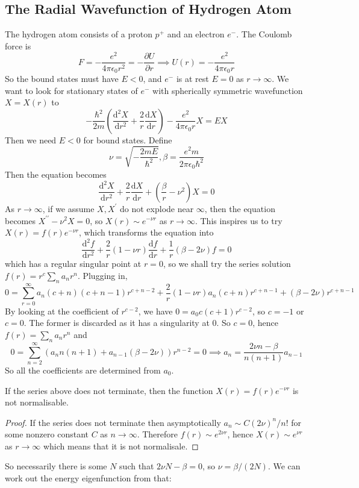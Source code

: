 \subsection{The Radial Wavefunction of Hydrogen Atom}
The hydrogen atom consists of a proton $p^+$ and an electron $e^-$.
The Coulomb force is
$$F=-\frac{e^2}{4\pi\epsilon_0r^2}=-\frac{\partial U}{\partial r}\implies U(r)=-\frac{e^2}{4\pi\epsilon_0r}$$
So the bound states must have $E<0$, and $e^-$ is at rest $E=0$ as $r\to\infty$.
We want to look for stationary states of $e^-$ with spherically symmetric wavefunction $X=X(r)$ to
$$-\frac{\hbar^2}{2m}\left( \frac{\mathrm d^2X}{\mathrm dr^2}+\frac{2}{r}\frac{\mathrm dX}{\mathrm dr} \right)-\frac{e^2}{4\pi\epsilon_0r}X=EX$$
Then we need $E<0$ for bound states.
Define
$$\nu=\sqrt{-\frac{2mE}{\hbar^2}},\beta=\frac{e^2m}{2\pi\epsilon_0\hbar^2}$$
Then the equation becomes
$$\frac{\mathrm d^2X}{\mathrm dr^2}+\frac{2}{r}\frac{\mathrm dX}{\mathrm dr}+\left( \frac{\beta}{r}-\nu^2 \right)X=0$$
As $r\to\infty$, if we assume $X,X^\prime$ do not explode near $\infty$, then the equation becomes $X^{\prime\prime}-\nu^2X=0$, so $X(r)\sim e^{-\nu r}$ as $r\to\infty$.
This inspires us to try $X(r)=f(r)e^{-\nu r}$, which transforms the equation into
$$\frac{\mathrm d^2f}{\mathrm dr^2}+\frac{2}{r}(1-\nu r)\frac{\mathrm df}{\mathrm dr}+\frac{1}{r}(\beta-2\nu)f=0$$
which has a regular singular point at $r=0$, so we shall try the series solution $f(r)=r^c\sum_n a_nr^n$.
Plugging in,
$$0=\sum_{r=0}^\infty a_n(c+n)(c+n-1)r^{c+n-2}+\frac{2}{r}(1-\nu r)a_n(c+n)r^{c+n-1}+(\beta-2\nu)r^{c+n-1}$$
By looking at the coefficient of $r^{c-2}$, we have $0=a_0c(c+1)r^{c-2}$, so $c=-1$ or $c=0$.
The former is discarded as it has a singularity at $0$.
So $c=0$, hence $f(r)=\sum_na_nr^n$ and
$$0=\sum_{n=2}^\infty (a_nn(n+1)+a_{n-1}(\beta-2\nu))r^{n-2}=0\implies a_n=\frac{2\nu n-\beta}{n(n+1)}a_{n-1}$$
So all the coefficients are determined from $a_0$.
\begin{lemma}
    If the series above does not terminate, then the function $X(r)=f(r)e^{-\nu r}$ is not normalisable.
\end{lemma}
\begin{proof}
    If the series does not terminate then asymptotically $a_n\sim C(2\nu)^n/n!$ for some nonzero constant $C$ as $n\to\infty$.
    Therefore $f(r)\sim e^{2\nu r}$, hence $X(r)\sim e^{\nu r}$ as $r\to\infty$ which means that it is not normalisale.
\end{proof}
So necessarily there is some $N$ such that $2\nu N-\beta=0$, so $\nu=\beta/(2N)$.
We can work out the energy eigenfunction from that:
